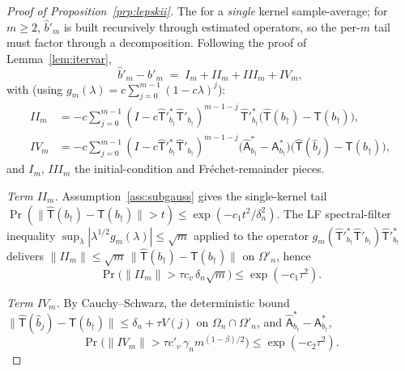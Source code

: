\begin{proof}[Proof of Proposition~\ref{prp:lepskii}]
The \citet[Theorem~6]{hansen2008} %
for a \emph{single} kernel sample-average; for $m \ge 2$, $\hat b'_m$ is
built recursively through estimated operators, so the per-$m$ tail must
factor through a decomposition. Following the proof of
Lemma~\ref{lem:itervar},
\begin{equation}\label{eq:fourterm-pf}
\hat b'_m - b'_m \;=\; I_m + II_m + III_m + IV_m,
\end{equation}
with (using $g_m(\lambda) = c\sum_{j=0}^{m-1}(1 - c\lambda)^j$):
\begin{align*}
II_m  &= -c\sum_{j=0}^{m-1}\!(I - c\hat{\mathsf T}'^{*}_{b_\dagger}\hat{\mathsf T}'_{b_\dagger})^{m-1-j}\,
        \hat{\mathsf T}'^{*}_{b_\dagger}\bigl(\hat{\mathsf T}(b_\dagger) - \mathsf T(b_\dagger)\bigr),\\
IV_m  &= -c\sum_{j=0}^{m-1}(I - c\hat{\mathsf T}'^{*}_{b_\dagger}\hat{\mathsf T}'_{b_\dagger})^{m-1-j}
        \bigl(\hat{\mathsf A}^{*}_{b_\dagger} - \mathsf A^{*}_{b_\dagger}\bigr)\bigl(\hat{\mathsf T}(\hat b_j) - \mathsf T(b_\dagger)\bigr),
\end{align*}
and $I_m$, $III_m$ the initial-condition and Fr\'echet-remainder pieces.

\emph{Term $II_m$.} \citet[Theorem~6]{hansen2008} %
Assumption~\ref{ass:subgauss} gives the single-kernel tail
$\Pr(\|\hat{\mathsf T}(b_\dagger) - \mathsf T(b_\dagger)\| > t) \le
\exp(-c_1 t^2/\delta_n^2)$. The LF spectral-filter inequality
$\sup_\lambda |\lambda^{1/2}g_m(\lambda)| \le \sqrt m$
\citep[Eq.~6.5]{engl2000} applied to the operator
$g_m(\hat{\mathsf T}'^{*}_{b_\dagger}\hat{\mathsf T}'_{b_\dagger})\hat{\mathsf T}'^{*}_{b_\dagger}$
delivers $\|II_m\| \le \sqrt m \,\|\hat{\mathsf T}(b_\dagger) - \mathsf T(b_\dagger)\|$
on $\Omega'_n$, hence
\begin{equation}\label{eq:II-tail-pf}
\Pr\!\bigl(\|II_m\| > \tau c_v\,\delta_n\sqrt m\bigr) \le \exp(-c_1\tau^2).
\end{equation}

\emph{Term $IV_m$.} By Cauchy--Schwarz, the deterministic bound
$\|\hat{\mathsf T}(\hat b_j) - \mathsf T(b_\dagger)\| \le \delta_n + \tau V(j)$
on $\Omega_n \cap \Omega'_n$, and \citet[Theorem~6]{hansen2008} %
$\hat{\mathsf A}^{*}_{b_\dagger} - \mathsf A^{*}_{b_\dagger}$,
\begin{equation}\label{eq:IV-tail-pf}
\Pr\!\bigl(\|IV_m\| > \tau c'_v\,\gamma_n m^{(1-\beta)/2}\bigr) \le \exp(-c_2\tau^2).
\end{equation}


\end{proof}
